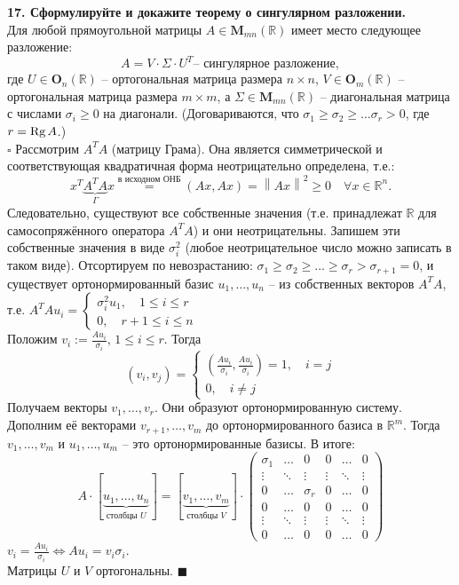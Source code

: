 \documentclass[11pt,a4paper]{article}
\newcommand{\R}{\mathbb{R}}
\newcommand{\Rg}[1]{\mathrm{Rg}\hspace{0.5mm}#1}
\newcommand{\proof}{$\square$ }
\newcommand{\qed}{\hfill$\blacksquare$}
\begin{document}
\textbf{17. Сформулируйте и докажите теорему о сингулярном разложении.\\}
Для любой прямоугольной матрицы $A \in \mathbf{M}_{mn} (\R)$ имеет место следующее разложение:
$$A = V \cdot \Sigma \cdot U^T \text{-- сингулярное разложение},$$
где $U \in \mathbf{O}_n (\R)$ -- ортогональная матрица размера $n \times n$, $V \in \mathbf{O}_m (\R)$ -- ортогональная матрица размера $m \times m$, а $\Sigma \in \mathbf{M}_{mn} (\R)$ -- диагональная матрица с числами $\sigma_i \geq 0$ на диагонали. (Договариваются, что $\sigma_1 \geq \sigma_2 \geq \hdots \sigma_r > 0$, где $r = \Rg{A}$.)\\
\proof Рассмотрим $A^T A$ (матрицу Грама). Она является симметрической и соответствующая квадратичная форма неотрицательно определена, т.е.:
$$x^T \underbrace{A^T A}_{\Gamma} x \stackrel{\text{в исходном ОНБ}}{=} (Ax, Ax) = \left\| Ax \right\|^2 \geq 0 \quad \forall x \in \R^n.$$
Следовательно, существуют все собственные значения (т.е. принадлежат $\R$ для самосопряжённого оператора $A^T A$) и они неотрицательны. Запишем эти собственные значения в виде $\sigma_i^2$ (любое неотрицательное число можно записать в таком виде). Отсортируем по невозрастанию: $\sigma_1 \geq \sigma_2 \geq \hdots \geq \sigma_r > \sigma_{r+1} = 0$, и существует ортонормированный базис $u_1, \hdots, u_n$ -- из собственных векторов $A^T A$, т.е. $A^T A u_i = \begin{cases} \sigma_i^2 u_1, \quad 1 \leq i \leq r \\
0, \quad r+1 \leq i \leq n\end{cases}$\\
Положим $v_i := \frac{A u_i}{\sigma_i}$, $1 \leq i \leq r$. Тогда
$$(v_i, v_j) = \begin{cases}
(\frac{A u_i}{\sigma_i}, \frac{A u_i}{\sigma_i}) = 1, \quad i = j \\
0, \quad i \neq j
\end{cases}$$
Получаем векторы $v_1, \hdots, v_r$. Они образуют ортонормированную систему. Дополним её векторами $v_{r+1}, \hdots, v_m$ до ортонормированного базиса в $\R^m$. Тогда $v_1, \hdots, v_m$ и $u_1, \hdots, u_m$ -- это ортонормированные базисы. В итоге:
$$A \cdot [\underbrace{u_1, \hdots, u_n}_{\text{столбцы } U}] = [\underbrace{v_1, \hdots, v_m}_{\text{столбцы } V}] \cdot \left( \begin{matrix}
\sigma_1 & \hdots &     0    &    0   & \hdots &    0   \\
 \vdots  & \ddots &  \vdots  & \vdots & \ddots & \vdots \\
    0    & \hdots & \sigma_r &    0   & \hdots &    0   \\
    0    & \hdots &     0    &    0   & \hdots &    0   \\
 \vdots  & \ddots &  \vdots  & \vdots & \ddots & \vdots \\
    0    & \hdots &     0    &    0   & \hdots &    0       
\end{matrix} \right)$$
$v_i = \frac{A u_i}{\sigma_i} \Leftrightarrow A u_i = v_i \sigma_i$.\\
Матрицы $U$ и $V$ ортогональны. \qed
\end{document}

